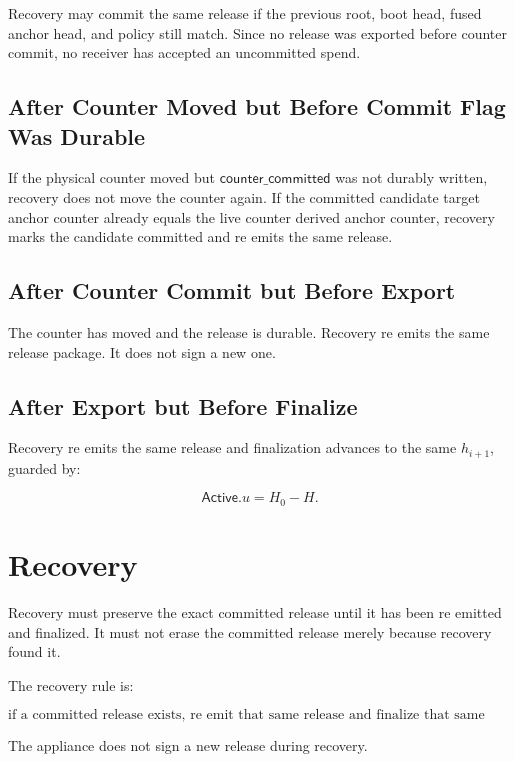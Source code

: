 \documentclass[11pt]{article}
\theoremstyle{definition}
\theoremstyle{remark}
\newcommand{\Active}{\ensuremath{\mathsf{Active}}}
\begin{document}
Recovery may commit the same release if the previous root, boot head, fused anchor head, and policy
still match. Since no release was exported before counter commit, no receiver has accepted an
uncommitted spend.

\subsection{After Counter Moved but Before Commit Flag Was Durable}

If the physical counter moved but \(\mathsf{counter\_committed}\) was not durably written, recovery
does not move the counter again. If the committed candidate target anchor counter already equals
the live counter derived anchor counter, recovery marks the candidate committed and re emits the
same release.

\subsection{After Counter Commit but Before Export}

The counter has moved and the release is durable. Recovery re emits the same release package. It
does not sign a new one.

\subsection{After Export but Before Finalize}

Recovery re emits the same release and finalization advances to the same \(h_{i+1}\), guarded by:

\[
\Active.u = H_0-H.
\]

\section{Recovery}

Recovery must preserve the exact committed release until it has been re emitted and finalized.
It must not erase the committed release merely because recovery found it.

The recovery rule is:

\[
\text{if a committed release exists, re emit that same release and finalize that same successor.}
\]

The appliance does not sign a new release during recovery.
\end{document}
